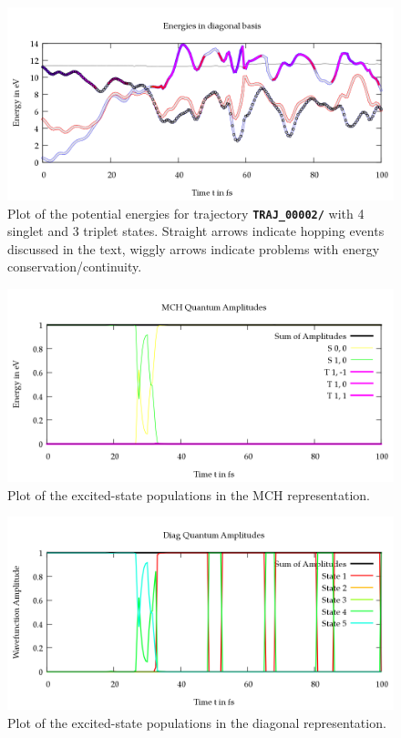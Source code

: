 \documentclass[a4paper,11pt,DIV=15,openany]{scrbook}
\newcommand{\ttt}[1]{\textbf{\texttt{#1}}}
\begin{document}
\begin{figure}[tb]
  \centering
  \includegraphics[width=\textwidth]{figures/energy.png}
  \caption{Plot of the potential energies for trajectory \ttt{TRAJ\_00002/} with 4 singlet and 3 triplet states. Straight arrows indicate hopping events discussed in the text, wiggly arrows indicate problems with energy conservation/continuity. }
  \label{fig:en}
\end{figure}
\begin{figure}[tb]
  \centering
  \includegraphics[width=\textwidth]{figures/coeff_MCH.png}
  \caption{Plot of the excited-state populations in the MCH representation.}
  \label{fig:cMCH}
\end{figure}
\begin{figure}[tb]
  \centering
  \includegraphics[width=\textwidth]{figures/coeff_diag.png}
  \caption{Plot of the excited-state populations in the diagonal representation.}
  \label{fig:cDIAG}
\end{figure}
\end{document}
